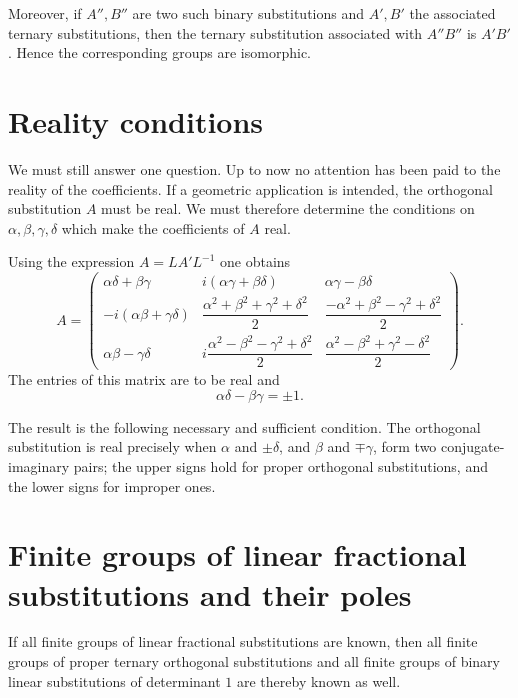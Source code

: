 \documentclass[11pt]{article}
\begin{document}
Moreover, if $A'',B''$ are two such binary substitutions and $A',B'$ the associated ternary substitutions, then the ternary substitution associated with $A''B''$ is $A'B'$.  Hence the corresponding groups are isomorphic.

\section{Reality conditions}

We must still answer one question.  Up to now no attention has been paid to the reality of the coefficients.  If a geometric application is intended, the orthogonal substitution $A$ must be real.  We must therefore determine the conditions on $\alpha,\beta,\gamma,\delta$ which make the coefficients of $A$ real.

Using the expression $A=LA'L^{-1}$ one obtains
\[
A=\begin{pmatrix}
\alpha\delta+\beta\gamma&i(\alpha\gamma+\beta\delta)&\alpha\gamma-\beta\delta\\
-i(\alpha\beta+\gamma\delta)&\dfrac{\alpha^2+\beta^2+\gamma^2+\delta^2}{2}&\dfrac{-\alpha^2+\beta^2-\gamma^2+\delta^2}{2}\\
\alpha\beta-\gamma\delta&i\dfrac{\alpha^2-\beta^2-\gamma^2+\delta^2}{2}&\dfrac{\alpha^2-\beta^2+\gamma^2-\delta^2}{2}
\end{pmatrix}.
\]
The entries of this matrix are to be real and
\begin{equation}\label{eq:w9-real-det}
 \alpha\delta-\beta\gamma=\pm1.
\end{equation}

The result is the following necessary and sufficient condition.  The orthogonal substitution is real precisely when $\alpha$ and $\pm\delta$, and $\beta$ and $\mp\gamma$, form two conjugate-imaginary pairs; the upper signs hold for proper orthogonal substitutions, and the lower signs for improper ones.

\section{Finite groups of linear fractional substitutions and their poles}

If all finite groups of linear fractional substitutions are known, then all finite groups of proper ternary orthogonal substitutions and all finite groups of binary linear substitutions of determinant $1$ are thereby known as well.
\end{document}
